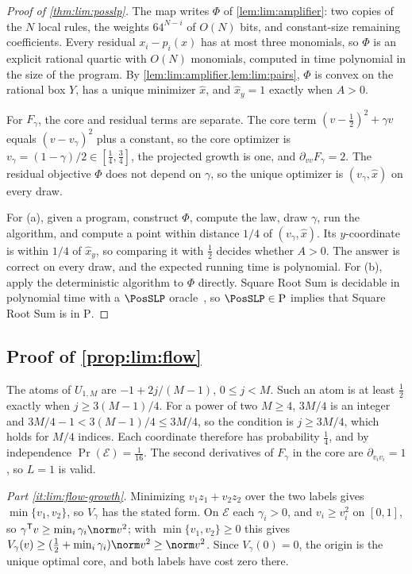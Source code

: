 \begin{proof}[Proof of \cref{thm:lim:posslp}]
The map writes $\Phi$ of \cref{lem:lim:amplifier}: two copies of the
$N$ local rules, the weights $64^{N-i}$ of $O(N)$ bits, and constant-size
remaining coefficients. Every residual $x_i-p_i(x)$ has at most three
monomials, so $\Phi$ is an explicit rational quartic with $O(N)$ monomials,
computed in time polynomial in the size of the program. By
\cref{lem:lim:amplifier,lem:lim:pairs}, $\Phi$ is convex on the rational box
$Y$, has a unique minimizer $\hat x$, and $\hat x_y=1$ exactly when $A>0$.

For $F_\gamma$, the core and residual terms are separate. The core term
$(v-\frac12)^2+\gamma v$ equals $(v-v_\gamma)^2$ plus a constant, so the
core optimizer is $v_\gamma=(1-\gamma)/2\in[\frac14,\frac34]$, the projected
growth is one, and $\partial_{vv}F_\gamma=2$. The residual objective $\Phi$
does not depend on $\gamma$, so the unique optimizer is
$(v_\gamma,\hat x)$ on every draw.

For (a), given a program, construct $\Phi$, compute the law, draw $\gamma$,
run the algorithm, and compute a point within distance $1/4$ of
$(v_\gamma,\hat x)$. Its $y$-coordinate is within $1/4$ of $\hat x_y$, so
comparing it with $\frac12$ decides whether $A>0$. The answer is correct on
every draw, and the expected running time is polynomial. For (b), apply the
deterministic algorithm to $\Phi$ directly. Square Root Sum is decidable in
polynomial time with a $\PosSLP$ oracle~\citep{AllenderEtAl2009}, so
$\PosSLP\in\mathrm P$ implies that Square Root Sum is in $\mathrm P$.
\end{proof}

\subsection{Proof of \texorpdfstring{\cref{prop:lim:flow}}{the flow-boundary proposition}}\label{app:lim:flow}

The atoms of $U_{1,M}$ are $-1+2j/(M-1)$, $0\le j<M$. Such an atom is at
least $\frac12$ exactly when $j\ge3(M-1)/4$. For a power of two $M\ge4$,
$3M/4$ is an integer and $3M/4-1<3(M-1)/4\le3M/4$, so the condition is
$j\ge3M/4$, which holds for $M/4$ indices. Each coordinate therefore has
probability $\frac14$, and by independence $\Pr(\mathcal E)=\frac1{16}$. The
second derivatives of $F_\gamma$ in the core are $\partial_{v_iv_i}=1$, so
$L=1$ is valid.

\emph{Part \ref{it:lim:flow-growth}.} Minimizing $v_1z_1+v_2z_2$ over the
two labels gives $\min\{v_1,v_2\}$, so $V_\gamma$ has the stated form. On
$\mathcal E$ each $\gamma_i>0$, and $v_i\ge v_i^2$ on $[0,1]$, so
$\gamma^{\mathsf T}v\ge\min_i\gamma_i\norm v^2$; with $\min\{v_1,v_2\}\ge0$
this gives $V_\gamma(v)\ge(\frac12+\min_i\gamma_i)\norm v^2\ge\norm v^2$.
Since $V_\gamma(0)=0$, the origin is the unique optimal core, and both
labels have cost zero there.

